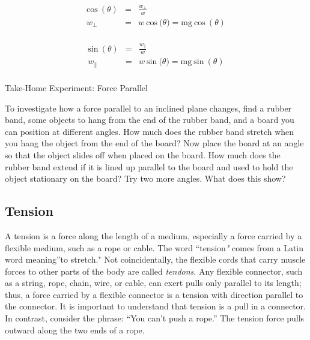 \documentclass[
]{book}
\newenvironment{note}{}{}
\begin{document}
\begin{note}
\leavevmode\hypertarget{eip-id2503179}{}%
\[\begin{array}{lll}
{\text{cos}\ (\theta)} & = & \frac{w_{\bot}}{w} \\
w_{\bot} & = & {w\ \text{cos}\ (\theta{) = {\text{mg}\ }}\text{cos}\ (\theta)} \\
\end{array}{}\]

\leavevmode\hypertarget{eip-id1900825}{}%
\[\begin{array}{lll}
{\text{sin}\ (\theta)} & = & \frac{w_{\parallel}}{w} \\
w_{\parallel} & = & {w\ \text{sin}\ (\theta{) = {\text{mg}\ }}\text{sin}\ (\theta)} \\
\end{array}{}\]

\end{note}

\hypertarget{fs-id2378314}{}
\begin{note}

Take-Home Experiment: Force Parallel

To investigate how a force parallel to an inclined plane changes, find a
rubber band, some objects to hang from the end of the rubber band, and a
board you can position at different angles. How much does the rubber
band stretch when you hang the object from the end of the board? Now
place the board at an angle so that the object slides off when placed on
the board. How much does the rubber band extend if it is lined up
parallel to the board and used to hold the object stationary on the
board? Try two more angles. What does this show?

\end{note}

\hypertarget{fs-id1477607}{}
\hypertarget{tension}{%
\subsection{Tension}\label{tension}}

A \protect\hypertarget{import-auto-id1608257}{}{tension}\textbf{} is a force along the
length of a medium, especially a force carried by a flexible medium,
such as a rope or cable. The word ``tension\emph{"} comes from a Latin word
meaning''to stretch." Not coincidentally, the flexible cords that carry
muscle forces to other parts of the body are called \emph{tendons}. Any
flexible connector, such as a string, rope, chain, wire, or cable, can
exert pulls only parallel to its length; thus, a force carried by a
flexible connector is a tension with direction parallel to the
connector. It is important to understand that tension is a pull in a
connector. In contrast, consider the phrase: ``You can't push a rope.''
The tension force pulls outward along the two ends of a rope.
\end{document}
